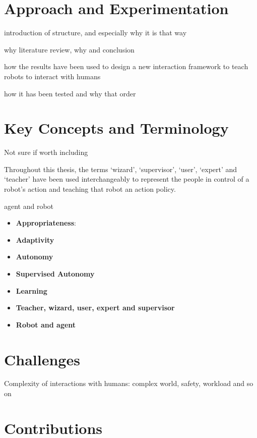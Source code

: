 \section{Approach and Experimentation}\label{sec:intro-exps}

introduction of structure, and especially why it is that way

why literature review, why and conclusion

how the results have been used to design a new interaction framework to teach robots to interact with humans

how it has been tested and why that order

\section{Key Concepts and Terminology}\label{sec:intro-concepts}

Not sure if worth including

Throughout this thesis, the terms `wizard', `supervisor', `user', `expert' and `teacher' have been used interchangeably to represent the people in control of a robot's action and teaching that robot an action policy.

agent and robot

\begin{itemize}
	\item \textbf{Appropriateness}:
	\item \textbf{Adaptivity}
	\item \textbf{Autonomy}
	\item \textbf{Supervised Autonomy}
	\item \textbf{Learning}
	\item \textbf{Teacher, wizard, user, expert and supervisor}
	\item \textbf{Robot and agent}
\end{itemize}

\section{Challenges}

Complexity of interactions with humans: complex world, safety, workload and so on

\section{Contributions}\label{sec:intro-contr}

